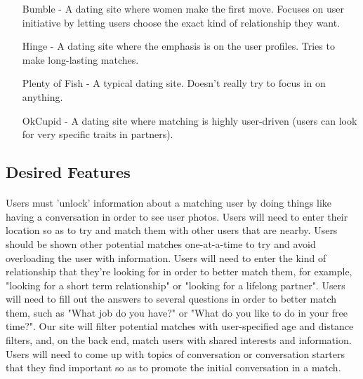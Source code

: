 \documentclass{article}
\begin{document}
\begin{enumerate}
\begin{enumerate}
                \item[Bumble -]
                A dating site where women make the first move. Focuses on user initiative by letting users choose the exact kind of relationship they want.\\
                
                \item[Hinge -]
                A dating site where the emphasis is on the user profiles. Tries to make long-lasting matches.\\
                
                \item[Plenty of Fish -]
                A typical dating site. Doesn't really try to focus in on anything.\\
                
                \item[OkCupid -]
                A dating site where matching is highly user-driven (users can look for very specific traits in partners).\\
            \end{enumerate}
        
        \subsection{Desired Features}
        \paragraph{}
        Users must 'unlock' information about a matching user by doing things like having a conversation in order to see user photos. Users will need to enter their location so as to try and match them with other users that are nearby. Users should be shown other potential matches one-at-a-time to try and avoid overloading the user with information. Users will need to enter the kind of relationship that they're looking for in order to better match them, for example, "looking for a short term relationship" or "looking for a lifelong partner". Users will need to fill out the answers to several questions in order to better match them, such as "What job do you have?" or "What do you like to do in your free time?". Our site will filter potential matches with user-specified age and distance filters, and, on the back end, match users with shared interests and information. Users will need to come up with topics of conversation or conversation starters that they find important so as to promote the initial conversation in a match.\\
    \end{enumerate}
\end{document}
